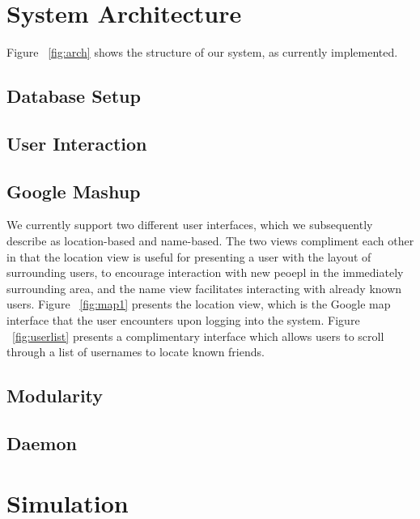 \documentclass[11pt]{article}
\begin{document}
\section{System Architecture}

Figure ~\ref{fig:arch} shows the structure of our system, as currently implemented. 


\subsection{Database Setup}


\subsection{User Interaction}


\subsection{Google Mashup}

We currently support two different user interfaces, which we subsequently describe as location-based and name-based. The two views compliment each other in that the location view is useful for presenting a user with the layout of surrounding users, to encourage interaction with new peoepl in the immediately surrounding area, and the name view facilitates interacting with already known users. Figure ~\ref{fig:map1} presents the location view, which is the Google map interface that the user encounters upon logging into the system. 
Figure ~\ref{fig:userlist} presents a complimentary interface which allows users to scroll through a list of usernames to locate known friends.

\subsection{Modularity}



\subsection{Daemon}


\section{Simulation}
\end{document}
